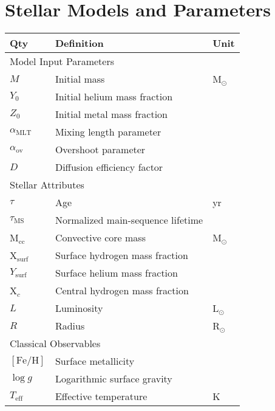 \section{Stellar Models and Parameters}
\begin{table}
\centering
{
\renewcommand{\arraystretch}{1.2}
\centering
\begin{tabular}{lll} 
\hline \hline  
\textbf{Qty} & \textbf{Definition} & \textbf{Unit} \\ 
\hline
\multicolumn{3}{l}{Model Input Parameters} \\ 
$M$ & Initial mass & M$_{\odot}$ \\
$Y_0$ & Initial helium mass fraction & \\
$Z_0$ & Initial metal mass fraction & \\
$\alpha_{\text{MLT}}$ & Mixing length parameter & \\
$\alpha_{\text{ov}}$ & Overshoot parameter & \\ 
$D$ & Diffusion efficiency factor & \\[8pt] 
%
\multicolumn{3}{l}{Stellar Attributes} \\
$\tau$ & Age & yr \\
$\tau_{\text{MS}}$ & Normalized main-sequence lifetime &  \\
M$_{\text{cc}}$ & Convective core mass & M$_{\odot}$ \\
X$_{\text{surf}}$ & Surface hydrogen mass fraction & \\
$Y_{\text{surf}}$ & Surface helium mass fraction & \\
X$_c$ & Central hydrogen mass fraction & \\
$L$ & Luminosity & L$_{\odot}$ \\ 
$R$ & Radius & R$_{\odot}$ \\[8pt]
%
%
%
\multicolumn{3}{l}{Classical Observables} \\
$[\text{Fe/H}]$ & Surface metallicity & \\
$\log{} g$ & Logarithmic surface gravity &  \\ %
$T_{\text{eff}}$ & Effective temperature & K \\[8pt]


\end{tabular}}
\end{table}
